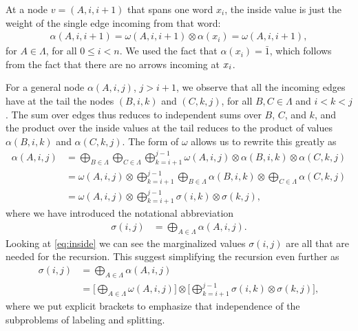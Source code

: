     At a node $v = (A, i, i+1)$ that spans one word $x_i$, the inside value is just the weight of the single edge incoming from that word:
    \begin{align}
        \label{eq:inside-base}
        \alpha(A, i, i+1) = \omega(A, i, i+1) \otimes \alpha(x_i) = \omega(A, i, i+1),
    \end{align}
    for $A \in \Lambda$, for all $0 \leq i < n$. We used the fact that $\alpha(x_i) = \bar{1}$, which follows from the fact that there are no arrows incoming at $x_i$.

    For a general node $\alpha(A, i, j)$, $j > i + 1$, we observe that all the incoming edges have at the tail the nodes $(B, i, k)$ and $(C, k, j)$, for all $B, C \in \Lambda$ and $i < k < j$. The sum over edges thus reduces to independent sums over $B$, $C$, and $k$, and the product over the inside values at the tail reduces to the product of values $\alpha(B, i, k)$ and $\alpha(C, k, j)$. The form of $\omega$ allows us to rewrite this greatly as
    \begin{align}
      \label{eq:inside}
      \alpha(A, i, j)
        &= \bigoplus_{B \in \Lambda} \bigoplus_{C \in \Lambda} \bigoplus_{k=i+1}^{j-1} \omega(A, i, j) \otimes \alpha(B,i,k) \otimes \alpha(C,k,j) \nonumber \\
        &= \omega(A, i, j) \otimes \bigoplus_{k=i+1}^{j-1} \bigoplus_{B \in \Lambda} \alpha(B,i,k) \otimes \bigoplus_{C \in \Lambda} \alpha(C,k,j) \nonumber \\
        &= \omega(A, i, j) \otimes \bigoplus_{k=i+1}^{j-1} \sigma(i,k) \otimes \sigma(k,j),
    \end{align}
    where we have introduced the notational abbreviation
    \begin{align*}
        \sigma(i,j) &= \bigoplus_{A \in \Lambda} \alpha(A,i,j).
    \end{align*}
    Looking at \ref{eq:inside} we can see the marginalized values $\sigma(i, j)$ are all that are needed for the recursion. This suggest simplifying the recursion even further as
    \begin{align}
      \label{eq:inside-simplified}
      \sigma(i, j)
        &= \bigoplus_{A \in \Lambda} \alpha(A,i,j) \nonumber \\
        &= \Bigg[ \bigoplus_{A \in \Lambda} \omega(A, i, j) \Bigg] \otimes \Bigg[\bigoplus_{k=i+1}^{j-1} \sigma(i,k) \otimes  \sigma(k,j) \Bigg],
    \end{align}
    where we put explicit brackets to emphasize that independence of the subproblems of labeling and splitting.


